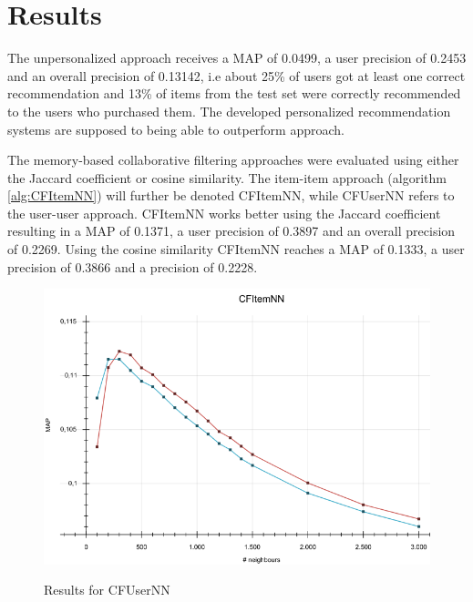 \documentclass[10pt]{reportMaster}
\begin{document}
\section{Results}
\label{sec:results}
The unpersonalized approach receives a MAP of 0.0499, a user precision of 0.2453 and an overall precision of 0.13142, i.e about 25\% of users got at least one correct recommendation and 13\% of items from the test set were correctly recommended to the users who purchased them.
The developed personalized recommendation systems are supposed to being able to outperform approach.

The memory-based collaborative filtering approaches were evaluated using either the Jaccard coefficient or cosine similarity.
The item-item approach (algorithm \ref{alg:CFItemNN}) will further be denoted CFItemNN, while CFUserNN refers to the user-user approach.
CFItemNN works better using the Jaccard coefficient resulting in a MAP of 0.1371, a user precision of 0.3897 and an overall precision of 0.2269.
Using the cosine similarity CFItemNN reaches a MAP of 0.1333, a user precision of 0.3866 and a precision of 0.2228.

\begin{figure}
	\caption{Results for CFUserNN}
	\centering
	\includegraphics[width=1\textwidth]{figures/experiments/CFUserNN}
	\label{fig:CFUserNN}
\end{figure}
\end{document}
